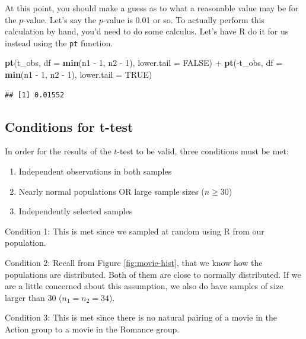 \documentclass[]{tufte-book}
\newenvironment{Shaded}{\begin{snugshade}}{\end{snugshade}}
\newcommand{\KeywordTok}[1]{\textcolor[rgb]{0.13,0.29,0.53}{\textbf{{#1}}}}
\newcommand{\DataTypeTok}[1]{\textcolor[rgb]{0.13,0.29,0.53}{{#1}}}
\newcommand{\DecValTok}[1]{\textcolor[rgb]{0.00,0.00,0.81}{{#1}}}
\newcommand{\StringTok}[1]{\textcolor[rgb]{0.31,0.60,0.02}{{#1}}}
\newcommand{\OtherTok}[1]{\textcolor[rgb]{0.56,0.35,0.01}{{#1}}}
\newcommand{\NormalTok}[1]{{#1}}
\providecommand{\tightlist}{%
  \setlength{\itemsep}{0pt}\setlength{\parskip}{0pt}}
\theoremstyle{definition}
\theoremstyle{definition}
\theoremstyle{remark}
\begin{document}
At this point, you should make a guess as to what a reasonable value may
be for the \(p\)-value. Let's say the \(p\)-value is 0.01 or so. To
actually perform this calculation by hand, you'd need to do some
calculus. Let's have R do it for us instead using the \texttt{pt}
function.

\begin{Shaded}
\begin{Highlighting}[]
\KeywordTok{pt}\NormalTok{(t_obs, }\DataTypeTok{df =} \KeywordTok{min}\NormalTok{(n1 -}\StringTok{ }\DecValTok{1}\NormalTok{, n2 -}\StringTok{ }\DecValTok{1}\NormalTok{), }\DataTypeTok{lower.tail =} \OtherTok{FALSE}\NormalTok{) +}
\StringTok{  }\KeywordTok{pt}\NormalTok{(-t_obs, }\DataTypeTok{df =} \KeywordTok{min}\NormalTok{(n1 -}\StringTok{ }\DecValTok{1}\NormalTok{, n2 -}\StringTok{ }\DecValTok{1}\NormalTok{), }\DataTypeTok{lower.tail =} \OtherTok{TRUE}\NormalTok{)}
\end{Highlighting}
\end{Shaded}

\begin{verbatim}
## [1] 0.01552
\end{verbatim}

\subsection{Conditions for t-test}\label{conditions-for-t-test}

In order for the results of the \(t\)-test to be valid, three conditions
must be met:

\begin{enumerate}
\def\labelenumi{\arabic{enumi}.}
\tightlist
\item
  Independent observations in both samples
\item
  Nearly normal populations OR large sample sizes (\(n \ge 30\))
\item
  Independently selected samples
\end{enumerate}

Condition 1: This is met since we sampled at random using R from our
population.

Condition 2: Recall from Figure \ref{fig:movie-hist}, that we know how
the populations are distributed. Both of them are close to normally
distributed. If we are a little concerned about this assumption, we also
do have samples of size larger than 30 (\(n_1 = n_2 = 34\)).

Condition 3: This is met since there is no natural pairing of a movie in
the Action group to a movie in the Romance group.
\end{document}
